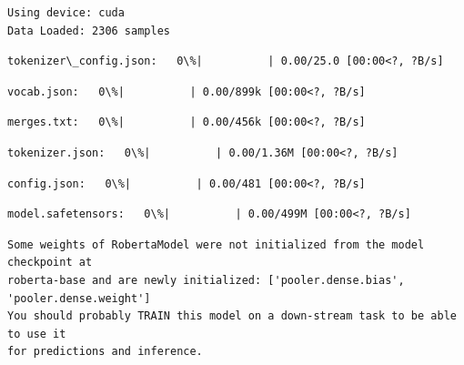 \documentclass[11pt]{article}
\begin{document}
    \begin{Verbatim}[commandchars=\\\{\}]
Using device: cuda
Data Loaded: 2306 samples
    \end{Verbatim}

    
    \begin{Verbatim}[commandchars=\\\{\}]
tokenizer\_config.json:   0\%|          | 0.00/25.0 [00:00<?, ?B/s]
    \end{Verbatim}

    
    
    \begin{Verbatim}[commandchars=\\\{\}]
vocab.json:   0\%|          | 0.00/899k [00:00<?, ?B/s]
    \end{Verbatim}

    
    
    \begin{Verbatim}[commandchars=\\\{\}]
merges.txt:   0\%|          | 0.00/456k [00:00<?, ?B/s]
    \end{Verbatim}

    
    
    \begin{Verbatim}[commandchars=\\\{\}]
tokenizer.json:   0\%|          | 0.00/1.36M [00:00<?, ?B/s]
    \end{Verbatim}

    
    
    \begin{Verbatim}[commandchars=\\\{\}]
config.json:   0\%|          | 0.00/481 [00:00<?, ?B/s]
    \end{Verbatim}

    
    
    \begin{Verbatim}[commandchars=\\\{\}]
model.safetensors:   0\%|          | 0.00/499M [00:00<?, ?B/s]
    \end{Verbatim}

    
    \begin{Verbatim}[commandchars=\\\{\}]
Some weights of RobertaModel were not initialized from the model checkpoint at
roberta-base and are newly initialized: ['pooler.dense.bias',
'pooler.dense.weight']
You should probably TRAIN this model on a down-stream task to be able to use it
for predictions and inference.
    \end{Verbatim}
\end{document}
